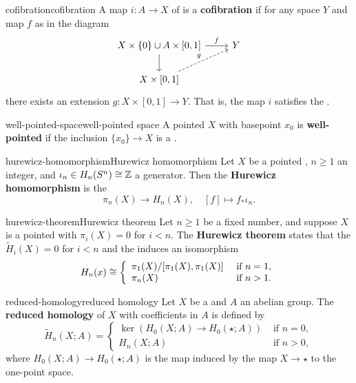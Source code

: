 \begin{topic}{cofibration}{cofibration}
    A map $i : A \to X$ of  is a \textbf{cofibration} if for any space $Y$ and map $f$ as in the diagram
    \[ \begin{tikzcd} X \times \{ 0 \} \cup A \times [0, 1] \arrow{r}{f} \arrow{d} & Y \\ X \times [0, 1] \arrow[dashed]{ur}{g} \end{tikzcd} \]
    there exists an extension $g : X \times [0, 1] \to Y$. That is, the map $i$ satisfies the .
\end{topic}

\begin{topic}{well-pointed-space}{well-pointed space}
    A pointed  $X$ with basepoint $x_0$ is \textbf{well-pointed} if the inclusion $\{ x_0 \} \to X$ is a .
\end{topic}

\begin{topic}{hurewicz-homomorphism}{Hurewicz homomorphism}
    Let $X$ be a pointed , $n \ge 1$ an integer, and $\iota_n \in H_n(S^n) \cong \mathbb{Z}$ a generator. Then the \textbf{Hurewicz homomorphism} is the 
    \[ \pi_n(X) \to H_n(X), \quad [f] \mapsto f_* \iota_n . \]
\end{topic}

\begin{topic}{hurewicz-theorem}{Hurewicz theorem}
    Let $n \ge 1$ be a fixed number, and suppose $X$ is a pointed  with $\pi_i(X) = 0$ for $i < n$. The \textbf{Hurewicz theorem} states that the  $\tilde{H}_i(X) = 0$ for $i < n$ and the  induces an isomorphism
    \[ H_n(x) \cong \left\{ \begin{array}{ll} \pi_1(X) / [\pi_1(X), \pi_1(X)] & \text{ if } n = 1 , \\ \pi_n(X) & \text{ if } n > 1 . \end{array} \right. \]
\end{topic}

\begin{topic}{reduced-homology}{reduced homology}
    Let $X$ be a  and $A$ an abelian group. The \textbf{reduced homology} of $X$ with coefficients in $A$ is defined by
    \[ \tilde{H}_n(X; A) = \left\{ \begin{array}{ll} \ker(H_0(X; A) \to H_0(\star; A)) & \text{ if } n = 0 , \\ H_n(X; A) & \text{ if } n > 0 , \end{array} \right. \]
    where $H_0(X; A) \to H_0(\star; A)$ is the map induced by the map $X \to \star$ to the one-point space.
\end{topic}

